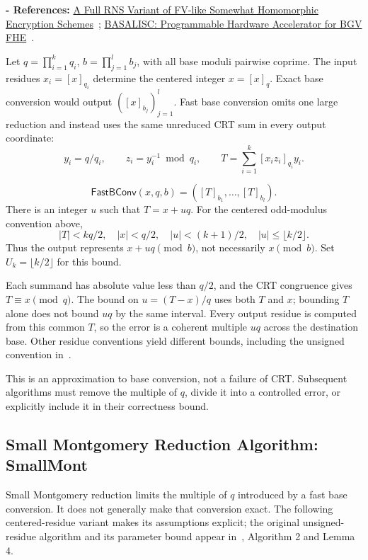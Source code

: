 \noindent \textbf{- References:} \href{https://eprint.iacr.org/2016/510}{A Full RNS Variant of FV-like Somewhat Homomorphic Encryption Schemes}~\cite{rns-bfv}; \href{https://eprint.iacr.org/2022/657}{BASALISC: Programmable Hardware Accelerator for BGV FHE}~\cite{rns-bfv2}.

Let $q=\prod_{i=1}^kq_i$, $b=\prod_{j=1}^lb_j$, with all base moduli pairwise coprime. The input residues $x_i=[x]_{q_i}$ determine the centered integer $x=[x]_q$. Exact base conversion would output $([x]_{b_j})_{j=1}^l$. Fast base conversion omits one large reduction and instead uses the same unreduced CRT sum in every output coordinate:
\[
y_i=q/q_i,\qquad z_i=y_i^{-1}\bmod q_i,\qquad
T=\sum_{i=1}^k[x_iz_i]_{q_i}y_i.
\]
\begin{tcolorbox}[title={\textbf{\tboxlabel{\ref*{subsec:rns-fastbconv}} Fast Base Conversion: \textsf{FastBConv}}}]
\[
\textsf{FastBConv}(x,q,b)=([T]_{b_1},\ldots,[T]_{b_l}).
\]
There is an integer $u$ such that $T=x+uq$. For the centered odd-modulus convention above,
\[
|T|<kq/2,\quad |x|<q/2,\quad |u|<(k+1)/2,
\quad |u|\leq\lfloor k/2\rfloor.
\]
Thus the output represents $x+uq\pmod b$, not necessarily $x\pmod b$. Set $U_k=\lfloor k/2\rfloor$ for this bound.
\end{tcolorbox}

\begin{myproof}
Each summand has absolute value less than $q/2$, and the CRT congruence gives $T\equiv x\pmod q$. The bound on $u=(T-x)/q$ uses both $T$ and $x$; bounding $T$ alone does not bound $uq$ by the same interval. Every output residue is computed from this common $T$, so the error is a coherent multiple $uq$ across the destination base. Other residue conventions yield different bounds, including the unsigned convention in~\cite{rns-bfv}.
\end{myproof}

This is an approximation to base conversion, not a failure of CRT. Subsequent algorithms must remove the multiple of $q$, divide it into a controlled error, or explicitly include it in their correctness bound.

\subsection{Small Montgomery Reduction Algorithm: \textsf{SmallMont}}
\label{subsec:rns-smallmont}

Small Montgomery reduction limits the multiple of $q$ introduced by a fast base conversion. It does not generally make that conversion exact. The following centered-residue variant makes its assumptions explicit; the original unsigned-residue algorithm and its parameter bound appear in~\cite{rns-bfv}, Algorithm 2 and Lemma 4.

